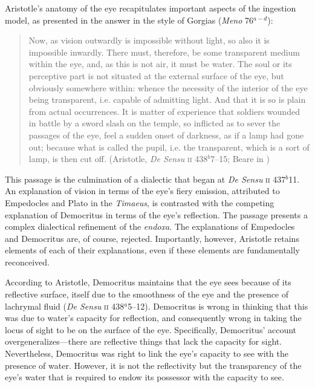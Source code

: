 Aristotle's anatomy of the eye recapitulates important aspects of the ingestion model, as presented in the answer in the style of Gorgias (\emph{Meno} 76\( ^{a-d} \)):
\begin{quote}
	Now, as vision outwardly is impossible without light, so also it is impossible inwardly. There must, therefore, be some transparent medium within the eye, and, as this is not air, it must be water. The soul or its perceptive part is not situated at the external surface of the eye, but obviously somewhere within: whence the necessity of the interior of the eye being transparent, i.e. capable of admitting light. And that it is so is plain from actual occurrences. It is matter of experience that soldiers wounded in battle by a sword slash on the temple, so inflicted as to sever the passages of the eye, feel a sudden onset of darkness, as if a lamp had gone out; because what is called the pupil, i.e. the transparent, which is a sort of lamp, is then cut off. (Aristotle, \emph{De Sensu} \textsc{ii} 438\( ^{b} \)7--15; Beare in \citealt[6]{Barnes:1984uq})
\end{quote}
This passage is the culmination of a dialectic that began at \emph{De Sensu} \textsc{ii} 437\( ^{b} \)11. An explanation of vision in terms of the eye's fiery emission, attributed to Empedocles and Plato in the \emph{Timaeus}, is contrasted with the competing explanation of Democritus in terms of the eye's reflection. The passage presents a complex dialectical refinement of the \emph{endoxa}. The explanations of Empedocles and Democritus are, of course, rejected. Importantly, however, Aristotle retains elements of each of their explanations, even if these elements are fundamentally reconceived.

According to Aristotle, Democritus maintains that the eye sees because of its reflective surface, itself due to the smoothness of the eye and the presence of lachrymal fluid (\emph{De Sensu} \textsc{ii} 438\( ^{a} \)5--12). Democritus is wrong in thinking that this was due to water's capacity for reflection, and consequently wrong in taking the locus of sight to be on the surface of the eye. Specifically, Democritus' account overgeneralizes---there are reflective things that lack the capacity for sight. Nevertheless, Democritus was right to link the eye's capacity to see with the presence of water. However, it is not the reflectivity but the transparency of the eye's water that is required to endow its possessor with the capacity to see. 

